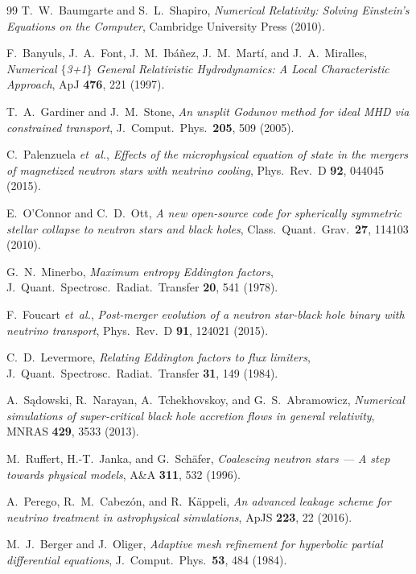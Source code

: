 \documentclass[aps,prd,twocolumn,superscriptaddress,nofootinbib,showpacs,
               longbibliography]{revtex4-2}
\begin{document}
\begin{thebibliography}{99}
T.~W.~Baumgarte and S.~L.~Shapiro,
\emph{Numerical Relativity: Solving Einstein's Equations on the Computer},
Cambridge University Press (2010).

F.~Banyuls, J.~A.~Font, J.~M.~Ib{\'a}{\~n}ez, J.~M.~Mart{\'i}, and J.~A.~Miralles,
\emph{Numerical $\{$3+1$\}$ General Relativistic Hydrodynamics: A Local Characteristic Approach},
ApJ \textbf{476}, 221 (1997).

T.~A.~Gardiner and J.~M.~Stone,
\emph{An unsplit Godunov method for ideal MHD via constrained transport},
J.\ Comput.\ Phys.\ \textbf{205}, 509 (2005).

C.~Palenzuela \emph{et~al.},
\emph{Effects of the microphysical equation of state in the mergers of magnetized neutron stars with neutrino cooling},
Phys.\ Rev.\ D \textbf{92}, 044045 (2015).

E.~O'Connor and C.~D.~Ott,
\emph{A new open-source code for spherically symmetric stellar collapse to neutron stars and black holes},
Class.\ Quant.\ Grav.\ \textbf{27}, 114103 (2010).

G.~N.~Minerbo,
\emph{Maximum entropy Eddington factors},
J.\ Quant.\ Spectrosc.\ Radiat.\ Transfer \textbf{20}, 541 (1978).

F.~Foucart \emph{et~al.},
\emph{Post-merger evolution of a neutron star-black hole binary with neutrino transport},
Phys.\ Rev.\ D \textbf{91}, 124021 (2015).

C.~D.~Levermore,
\emph{Relating Eddington factors to flux limiters},
J.\ Quant.\ Spectrosc.\ Radiat.\ Transfer \textbf{31}, 149 (1984).

A.~S\k{a}dowski, R.~Narayan, A.~Tchekhovskoy, and G.~S.~Abramowicz,
\emph{Numerical simulations of super-critical black hole accretion flows in general relativity},
MNRAS \textbf{429}, 3533 (2013).

M.~Ruffert, H.-T.~Janka, and G.~Sch{\"a}fer,
\emph{Coalescing neutron stars --- A step towards physical models},
A\&A \textbf{311}, 532 (1996).

A.~Perego, R.~M.~Cabez{\'o}n, and R.~K{\"a}ppeli,
\emph{An advanced leakage scheme for neutrino treatment in astrophysical simulations},
ApJS \textbf{223}, 22 (2016).

M.~J.~Berger and J.~Oliger,
\emph{Adaptive mesh refinement for hyperbolic partial differential equations},
J.\ Comput.\ Phys.\ \textbf{53}, 484 (1984).


\end{thebibliography}
\end{document}
